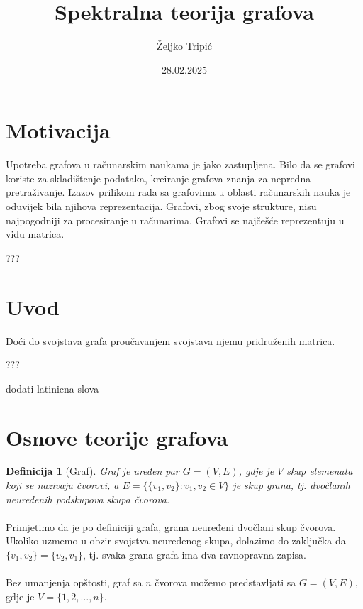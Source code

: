 \documentclass[11pt]{article}
\title{Spektralna teorija grafova}
\author{Željko Tripić}
\date{28.02.2025}
\newtheorem{definition}{Definicija}
\begin{document}
	\maketitle
	
	\section{Motivacija}
	Upotreba grafova u računarskim naukama je jako zastupljena. Bilo da se grafovi koriste za skladištenje podataka, 
	kreiranje grafova znanja za nepredna pretraživanje. Izazov prilikom rada sa grafovima u oblasti računarskih nauka je oduvijek
	bila njihova reprezentacija. Grafovi, zbog svoje strukture, nisu najpogodniji za procesiranje u računarima.
	Grafovi se najčešće reprezentuju u vidu matrica.

    ???
	
	\section{Uvod}
	Doći do svojstava grafa proučavanjem svojstava njemu pridruženih matrica. 

    ???

    dodati latinicna slova
	
	\section{Osnove teorije grafova}
	
		\begin{definition}[Graf]
		Graf je uređen par $G = (V, E)$, gdje je $V$ skup elemenata koji se nazivaju čvorovi, a $E = \{ \{v_1, v_2\} : v_1, v_2 \in V \}$ je skup grana, tj. dvočlanih neuređenih podskupova skupa čvorova.
		\end{definition}
	
        \paragraph{}
        Primjetimo da je po definiciji grafa, grana neuređeni dvočlani skup čvorova. Ukoliko uzmemo u obzir svojstva neuređenog skupa, dolazimo do zaključka da $\{v_1,v_2\} = \{v_2, v_1\}$, tj. svaka grana grafa ima dva ravnopravna zapisa.
    
        \paragraph{}
        Bez umanjenja opštosti, graf sa $n$ čvorova možemo predstavljati sa $G = (V, E)$, gdje je $V = \{1, 2, \dots, n\}$.
	
\end{document}
